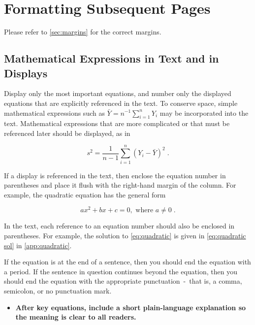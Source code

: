 \documentclass{scspaperproc}
\theoremstyle{scsthe}
\begin{document}
    \section{Formatting Subsequent Pages}
    Please refer to \autoref{sec:margins} for the correct margins.

    \subsection{Mathematical Expressions in Text and in Displays}
    Display only the most important equations, and number only the displayed equations that are explicitly referenced in the text. To conserve space, simple mathematical expressions such as \mbox{$\bar Y = n^{-1} \sum_{i=1}^n Y_i$} may be incorporated into the text. Mathematical expressions that are more complicated or that must be referenced later should be displayed, as in

    \begin{equation}
        s^2 = \frac 1 {n-1} \sum_{i=1}^n (Y_i - \bar Y)^2\;. \nonumber
    \end{equation}

    If a display is referenced in the text, then enclose the equation number in parentheses and place it flush with the right-hand margin of the column. For example, the quadratic equation has the general form

    \begin{equation} \label{eq:quadratic}
        ax^2 + bx + c = 0, \mbox{ where } a \ne 0\;.
    \end{equation}

    In the text, each reference to an equation number should also be enclosed in parentheses. For example, the solution to \eqref{eq:quadratic} is given in \eqref{eq:quadratic sol} in \autoref{app:quadratic}.

    If the equation is at the end of a sentence, then you should end the equation with a period. If the sentence in question continues beyond the equation, then you should end the equation with the appropriate punctuation~-~that is, a comma, semicolon, or no punctuation mark.

    \begin{itemize}
        \item \textbf{ After key equations, include a short plain-language explanation so the meaning is clear to all readers.}
    \end{itemize}
\end{document}
